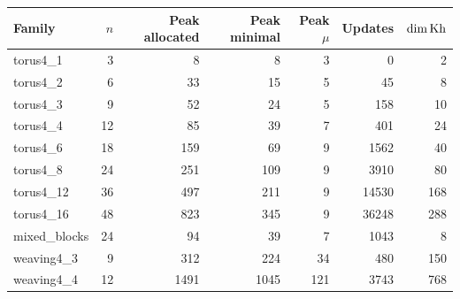 \begin{tabular}{lrrrrrr}
\toprule
Family & $n$ & Peak allocated & Peak minimal & Peak $\mu$ & Updates & $\dim\operatorname{Kh}$\\
\midrule
torus4\_1 & 3 & 8 & 8 & 3 & 0 & 2\\
torus4\_2 & 6 & 33 & 15 & 5 & 45 & 8\\
torus4\_3 & 9 & 52 & 24 & 5 & 158 & 10\\
torus4\_4 & 12 & 85 & 39 & 7 & 401 & 24\\
torus4\_6 & 18 & 159 & 69 & 9 & 1562 & 40\\
torus4\_8 & 24 & 251 & 109 & 9 & 3910 & 80\\
torus4\_12 & 36 & 497 & 211 & 9 & 14530 & 168\\
torus4\_16 & 48 & 823 & 345 & 9 & 36248 & 288\\
mixed\_blocks & 24 & 94 & 39 & 7 & 1043 & 8\\
weaving4\_3 & 9 & 312 & 224 & 34 & 480 & 150\\
weaving4\_4 & 12 & 1491 & 1045 & 121 & 3743 & 768\\
\bottomrule
\end{tabular}
